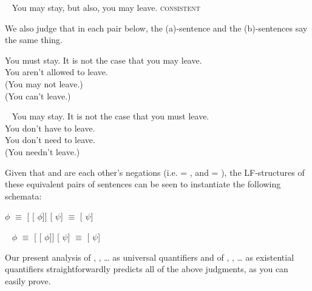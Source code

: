 \ex~ You may stay, but also, you may leave. \hfill\textsc{consistent} \xe

We also judge that in each pair below, the (a)-sentence and the (b)-sentences
say the same thing.

\pex\label{ex:must} \a You must stay. \a It is not the case that you may leave.\\
You aren't allowed to leave.\\
(You may not leave.)%
\\
(You can't leave.) \xe

\pex~ \a You may stay. \a It is not the case that you must leave.\\
You don't have to leave.\\
You don't need to leave.\\
(You needn't leave.)
\xe

%
Given that  and  are each other's negations
(i.e.  = , and  = ), the
LF-structures of these equivalent pairs of sentences can be seen to instantiate
the following schemata:

\pex \a {} $\phi$ $\equiv$  [
[ $\phi$]] \a {} [
\ensuremath{\psi}] $\equiv$  [
\ensuremath{\psi}] \xe

\pex~ \a {} $\phi$ $\equiv$  [
[ $\phi$]] \a {} [
\ensuremath{\psi}] $\equiv$  [
\ensuremath{\psi}] \xe

%
Our present analysis of , , \dots{} as
universal quantifiers and of , , \dots{} as
existential quantifiers straightforwardly predicts all of the above judgments,
as you can easily prove.

